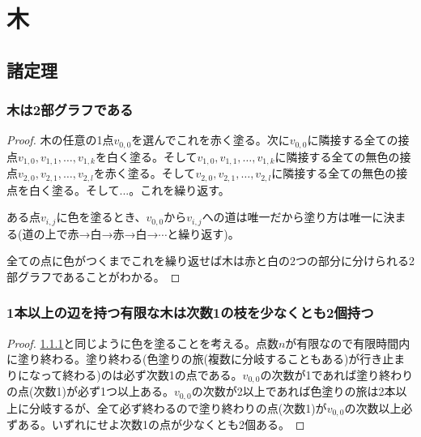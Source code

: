	\chapter{木}
		\section{諸定理}
			\subsection{木は2部グラフである}
				\label{subsec:木は2部グラフである}
				\begin{proof}
					\quad\par
					木の任意の1点$v_{0,0}$を選んでこれを赤く塗る。次に$v_{0,0}$に隣接する全ての接点$v_{1,0},v_{1,1},\dotsc,v_{1,k}$を白く塗る。そして$v_{1,0},v_{1,1},\dotsc,v_{1,k}$に隣接する全ての無色の接点$v_{2,0},v_{2,1},\dotsc,v_{2,l}$を赤く塗る。そして$v_{2,0},v_{2,1},\dotsc,v_{2,l}$に隣接する全ての無色の接点を白く塗る。そして...。これを繰り返す。
					\par
					ある点$v_{i,j}$に色を塗るとき、$v_{0,0}$から$v_{i,j}$への道は唯一だから塗り方は唯一に決まる(道の上で赤→白→赤→白→$\dotsb$と繰り返す)。
					\par
					全ての点に色がつくまでこれを繰り返せば木は赤と白の2つの部分に分けられる2部グラフであることがわかる。
				\end{proof}
			\subsection{1本以上の辺を持つ有限な木は次数1の枝を少なくとも2個持つ}
				\begin{proof}
					\quad\par
					\ref{subsec:木は2部グラフである}と同じように色を塗ることを考える。点数$n$が有限なので有限時間内に塗り終わる。塗り終わる(色塗りの旅(複数に分岐することもある)が行き止まりになって終わる)のは必ず次数1の点である。$v_{0,0}$の次数が1であれば塗り終わりの点(次数1)が必ず1つ以上ある。$v_{0,0}$の次数が2以上であれば色塗りの旅は2本以上に分岐するが、全て必ず終わるので塗り終わりの点(次数1)が$v_{0,0}$の次数以上必ずある。いずれにせよ次数1の点が少なくとも2個ある。
				\end{proof}
